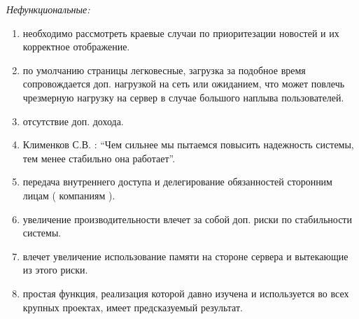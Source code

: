 \vspace{0.5cm}
\textit{Нефункциональные:}
\begin{enumerate}[noitemsep,topsep=0pt,parsep=0pt,partopsep=0pt]
    \item необходимо рассмотреть краевые случаи по приоритезации новостей и их корректное отображение.
    \item по умолчанию страницы легковесные, загрузка за подобное время сопровождается доп. нагрузкой на сеть или ожиданием, что может повлечь чрезмерную нагрузку на сервер в случае большого наплыва пользователей.
    \item отсутствие доп. дохода.
    \item Клименков С.В. : “Чем сильнее мы пытаемся повысить надежность системы, тем менее стабильно она работает”.
    \item передача внутреннего доступа и делегирование обязанностей сторонним лицам ( компаниям ).
    \item увеличение производительности влечет за собой доп. риски по стабильности системы.
    \item влечет увеличение использование памяти на стороне сервера и вытекающие из этого риски.
    \item простая функция, реализация которой давно изучена и используется во всех крупных проектах, имеет предсказуемый результат.
\end{enumerate}
\newpage
\BgThispage
